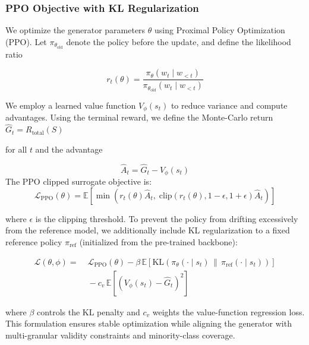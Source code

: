 \subsubsection{PPO Objective with KL Regularization}
We optimize the generator parameters $\theta$ using Proximal Policy Optimization (PPO). Let $\pi_{\theta_{\text{old}}}$ denote the policy before the update, and define the likelihood ratio

\begin{equation}
r_t(\theta) = \frac{\pi_\theta(w_t \mid w_{<t})}{\pi_{\theta_{\text{old}}}(w_t \mid w_{<t})}
\end{equation}

We employ a learned value function $V_\phi(s_t)$ to reduce variance and compute advantages. Using the terminal reward, we define the Monte-Carlo return 
$\hat{G}_t = R_{\text{total}}(S)$ 

for all $t$ and the advantage

\begin{equation}
\hat{A}_t = \hat{G}_t - V_\phi(s_t)
\end{equation}
The PPO clipped surrogate objective is:
\begin{equation}
\mathcal{L}_{\text{PPO}}(\theta) = \mathbb{E}\left[
\min\left(r_t(\theta)\hat{A}_t,\;
\text{clip}(r_t(\theta), 1-\epsilon, 1+\epsilon)\hat{A}_t\right)
\right]
\end{equation}

where $\epsilon$ is the clipping threshold. To prevent the policy from drifting excessively from the reference model, we additionally include KL regularization to a fixed reference policy $\pi_{\text{ref}}$ (initialized from the pre-trained backbone):

\begin{equation}
\begin{aligned}
\mathcal{L}(\theta,\phi) =
&\;\mathcal{L}_{\text{PPO}}(\theta)
- \beta\,\mathbb{E}\!\left[
\text{KL}\!\left(\pi_\theta(\cdot \mid s_t)\,\|\,\pi_{\text{ref}}(\cdot \mid s_t)\right)
\right] \\
&\; - c_v\,\mathbb{E}\!\left[
\left(V_\phi(s_t)-\hat{G}_t\right)^2
\right]
\end{aligned}
\end{equation}

where $\beta$ controls the KL penalty and $c_v$ weights the value-function regression loss. This formulation ensures stable optimization while aligning the generator with multi-granular validity constraints and minority-class coverage.










